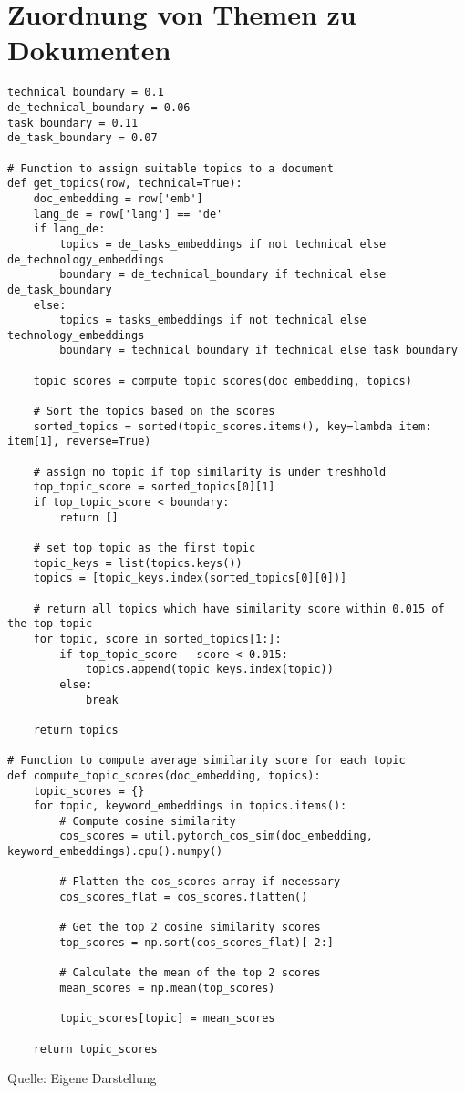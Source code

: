\section{Zuordnung von Themen zu Dokumenten}\label{lst:doc2topic}
\begin{lstlisting}
technical_boundary = 0.1
de_technical_boundary = 0.06
task_boundary = 0.11
de_task_boundary = 0.07

# Function to assign suitable topics to a document
def get_topics(row, technical=True):
    doc_embedding = row['emb']
    lang_de = row['lang'] == 'de'
    if lang_de:
        topics = de_tasks_embeddings if not technical else de_technology_embeddings
        boundary = de_technical_boundary if technical else de_task_boundary
    else:
        topics = tasks_embeddings if not technical else technology_embeddings
        boundary = technical_boundary if technical else task_boundary

    topic_scores = compute_topic_scores(doc_embedding, topics)

    # Sort the topics based on the scores
    sorted_topics = sorted(topic_scores.items(), key=lambda item: item[1], reverse=True)

	# assign no topic if top similarity is under treshhold
    top_topic_score = sorted_topics[0][1]
    if top_topic_score < boundary:
        return []

	# set top topic as the first topic
    topic_keys = list(topics.keys())
    topics = [topic_keys.index(sorted_topics[0][0])]

    # return all topics which have similarity score within 0.015 of the top topic
    for topic, score in sorted_topics[1:]:
        if top_topic_score - score < 0.015:
            topics.append(topic_keys.index(topic))
        else:
            break

    return topics

# Function to compute average similarity score for each topic
def compute_topic_scores(doc_embedding, topics):
    topic_scores = {}
    for topic, keyword_embeddings in topics.items():
        # Compute cosine similarity
        cos_scores = util.pytorch_cos_sim(doc_embedding, keyword_embeddings).cpu().numpy()
        
        # Flatten the cos_scores array if necessary
        cos_scores_flat = cos_scores.flatten()

        # Get the top 2 cosine similarity scores
        top_scores = np.sort(cos_scores_flat)[-2:]

        # Calculate the mean of the top 2 scores
        mean_scores = np.mean(top_scores)
        
        topic_scores[topic] = mean_scores
        
    return topic_scores
\end{lstlisting}
\vspace{-1.3em}
\normalsize{Quelle: Eigene Darstellung}